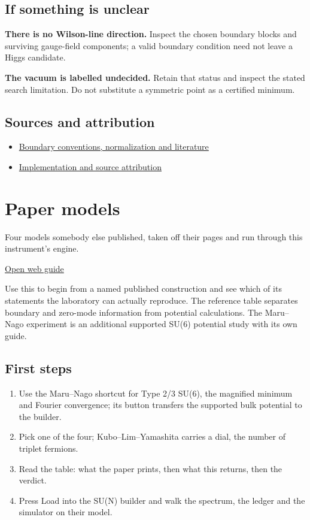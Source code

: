 \documentclass[11pt,a4paper]{article}
\begin{document}
\subsection*{If something is unclear}
\textbf{There is no Wilson-line direction.} Inspect the chosen boundary blocks and surviving gauge-field components; a valid boundary condition need not leave a Higgs candidate.

\textbf{The vacuum is labelled undecided.} Retain that status and inspect the stated search limitation. Do not substitute a symmetric point as a certified minimum.

\subsection*{Sources and attribution}
\begin{itemize}
\item \href{https://karlesmarin.github.io/ghu-explorer/docs/index.html}{Boundary conventions, normalization and literature}
\item \href{https://github.com/karlesmarin/ghu-lab/blob/main/src/sections/sun5d_section.js}{Implementation and source attribution}
\end{itemize}
\section{Paper models}
Four models somebody else published, taken off their pages and run through this instrument's engine.

\href{https://karlesmarin.github.io/ghu-explorer/guide/papers/index.html}{Open web guide}

Use this to begin from a named published construction and see which of its statements the laboratory can actually reproduce. The reference table separates boundary and zero-mode information from potential calculations. The Maru--Nago experiment is an additional supported SU(6) potential study with its own guide.
\subsection*{First steps}
\begin{enumerate}
\item Use the Maru--Nago shortcut for Type 2/3 SU(6), the magnified minimum and Fourier convergence; its button transfers the supported bulk potential to the builder.
\item Pick one of the four; Kubo--Lim--Yamashita carries a dial, the number of triplet fermions.
\item Read the table: what the paper prints, then what this returns, then the verdict.
\item Press Load into the SU(N) builder and walk the spectrum, the ledger and the simulator on their model.
\end{enumerate}
\end{document}
